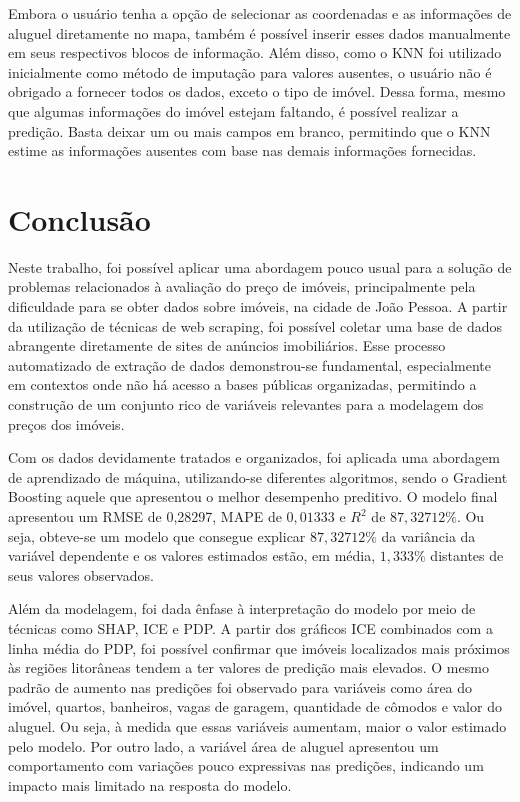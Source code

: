 \documentclass[
  12pt,
  a4paper,
]{scrreprt}
\begin{document}
Embora o usuário tenha a opção de selecionar as coordenadas e as
informações de aluguel diretamente no mapa, também é possível inserir
esses dados manualmente em seus respectivos blocos de informação. Além
disso, como o KNN foi utilizado inicialmente como método de imputação
para valores ausentes, o usuário não é obrigado a fornecer todos os
dados, exceto o tipo de imóvel. Dessa forma, mesmo que algumas
informações do imóvel estejam faltando, é possível realizar a predição.
Basta deixar um ou mais campos em branco, permitindo que o KNN estime as
informações ausentes com base nas demais informações fornecidas.

\chapter{Conclusão}\label{conclusuxe3o}

Neste trabalho, foi possível aplicar uma abordagem pouco usual para a
solução de problemas relacionados à avaliação do preço de imóveis,
principalmente pela dificuldade para se obter dados sobre imóveis, na
cidade de João Pessoa. A partir da utilização de técnicas de web
scraping, foi possível coletar uma base de dados abrangente diretamente
de sites de anúncios imobiliários. Esse processo automatizado de
extração de dados demonstrou-se fundamental, especialmente em contextos
onde não há acesso a bases públicas organizadas, permitindo a construção
de um conjunto rico de variáveis relevantes para a modelagem dos preços
dos imóveis.

\vspace{12pt}

Com os dados devidamente tratados e organizados, foi aplicada uma
abordagem de aprendizado de máquina, utilizando-se diferentes
algoritmos, sendo o Gradient Boosting aquele que apresentou o melhor
desempenho preditivo. O modelo final apresentou um RMSE de 0,28297, MAPE
de \(0,01333\) e \(R^2\) de \(87,32712\%\). Ou seja, obteve-se um modelo
que consegue explicar \(87,32712\%\) da variância da variável dependente
e os valores estimados estão, em média, \(1,333\%\) distantes de seus
valores observados.

\vspace{12pt}

Além da modelagem, foi dada ênfase à interpretação do modelo por meio de
técnicas como SHAP, ICE e PDP. A partir dos gráficos ICE combinados com
a linha média do PDP, foi possível confirmar que imóveis localizados
mais próximos às regiões litorâneas tendem a ter valores de predição
mais elevados. O mesmo padrão de aumento nas predições foi observado
para variáveis como área do imóvel, quartos, banheiros, vagas de
garagem, quantidade de cômodos e valor do aluguel. Ou seja, à medida que
essas variáveis aumentam, maior o valor estimado pelo modelo. Por outro
lado, a variável área de aluguel apresentou um comportamento com
variações pouco expressivas nas predições, indicando um impacto mais
limitado na resposta do modelo.
\end{document}
